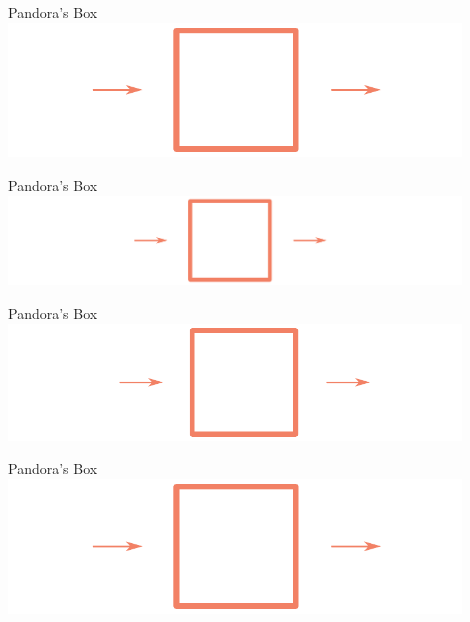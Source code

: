     \begin{frame}{Pandora's Box}
        \centering
        \includegraphics[width = 0.9\textwidth]{images/fourier-1.pdf}
    \end{frame}

    \begin{frame}{Pandora's Box}
        \centering
        \includegraphics[width = 0.9\textwidth]{images/fourier-2.pdf}
    \end{frame}

    \begin{frame}{Pandora's Box}
        \centering
        \includegraphics[width = 0.9\textwidth]{images/fourier-3.pdf}
    \end{frame}

    \begin{frame}{Pandora's Box}
        \centering
        \includegraphics[width = 0.9\textwidth]{images/fourier-4.pdf}
    \end{frame}

